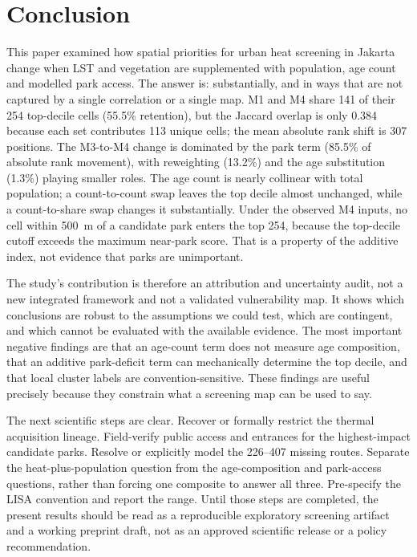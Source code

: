 \documentclass[times,twoside]{_Templates/MultiTargetManuscript}
\begin{document}
\section{Conclusion}

This paper examined how spatial priorities for urban heat screening in Jakarta
change when LST and vegetation are supplemented with population, age count and
modelled park access. The answer is: substantially, and in ways that are not
captured by a single correlation or a single map. M1 and M4 share 141 of their
254 top-decile cells (55.5\% retention), but the Jaccard overlap is only 0.384
because each set contributes 113 unique cells; the mean absolute rank shift is
307 positions. The
M3-to-M4 change is dominated by the park term (85.5\% of absolute rank movement),
with reweighting (13.2\%) and the age substitution (1.3\%) playing smaller roles.
The age count is nearly collinear with total population; a count-to-count swap
leaves the top decile almost unchanged, while a count-to-share swap changes it
substantially. Under the observed M4 inputs, no cell within 500~m of a candidate
park enters the top 254, because the top-decile cutoff exceeds the maximum
near-park score. That is a property of the additive index, not evidence that
parks are unimportant.

The study's contribution is therefore an attribution and uncertainty audit, not
a new integrated framework and not a validated vulnerability map. It shows which
conclusions are robust to the assumptions we could test, which are contingent,
and which cannot be evaluated with the available evidence. The most important
negative findings are that an age-count term does not measure age composition,
that an additive park-deficit term can mechanically determine the top decile,
and that local cluster labels are convention-sensitive. These findings are
useful precisely because they constrain what a screening map can be used to say.

The next scientific steps are clear. Recover or formally restrict the thermal
acquisition lineage. Field-verify public access and entrances for the
highest-impact candidate parks. Resolve or explicitly model the 226--407 missing
routes. Separate the heat-plus-population question from the age-composition and
park-access questions, rather than forcing one composite to answer all three.
Pre-specify the LISA convention and report the range. Until those steps are
completed, the present results should be read as a reproducible exploratory
screening artifact and a working preprint draft, not as an approved scientific
release or a policy recommendation.
\end{document}
